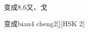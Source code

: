 \begin{entry}{变成}{8,6}{⼜、⼽}
  \begin{phonetics}{变成}{bian4 cheng2}[][HSK 2]
  \end{phonetics}
\end{entry}
